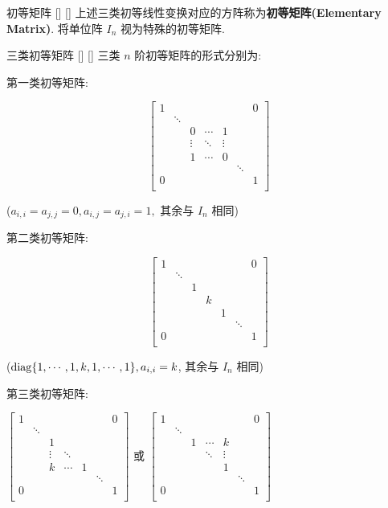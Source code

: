 \documentclass[UTF8]{ctexart}
\DeclareMathOperator{\0}{\mathbf{0}}
\DeclareMathOperator{\<}{\langle}
\renewcommand{\>}{\rangle}
\begin{document}
		\begin{dfn}
			[]
			{初等矩阵}
			[]
			[]
			上述三类初等线性变换对应的方阵称为\textbf{初等矩阵(Elementary Matrix)}. 将单位阵 \(I_n\) 视为特殊的初等矩阵. 
		\end{dfn}
		
		\begin{ppt}
			[]
			{三类初等矩阵}
			[]
			[]
			三类 \(n\) 阶初等矩阵的形式分别为: 
			
			第一类初等矩阵: 
			
			\[
			\begin{bmatrix}
				1 & & & & & & 0\\
				&\ddots & & & & & \\
				& & 0 & \cdots & 1 & & \\
				& &\vdots &\ddots &\vdots & & \\
				& & 1 & \cdots & 0 & & \\
				& & & & &\ddots & \\
				0 & & & & & & 1\\
			\end{bmatrix}
			\]
			
			(\(a_{i,i}=a_{j,j}=0,a_{i,j}=a_{j,i}=1,\)  其余与 \(I_n\) 相同)
			
			第二类初等矩阵: 
			
			\[
			\begin{bmatrix}
				1 & & & & & & 0\\
				&\ddots & & & & & \\
				& & 1 & & & & \\
				& & & k & & & \\
				& & & & 1 & & \\
				& & & & & \ddots & \\
				0 & & & & & & 1\\
			\end{bmatrix}
			\]
			
			(\({\rm diag}\{1,\cdots,1,k,1,\cdots,1\}, a_{i,i}=k\), 其余与 \(I_n\) 相同)
			
			第三类初等矩阵: 
			
			 \(\begin{bmatrix}
			1 & & & & & & 0\\
			 &\ddots & & & & & \\
			 & & 1 & & & & \\
			 & &\vdots &\ddots & & & \\
			 & & k & \cdots & 1 & & \\
			 & & & & &\ddots & \\
			0 & & & & & & 1\\
			\end{bmatrix}\) 
			或
			 \(\begin{bmatrix}
			1 & & & & & & 0\\
			 &\ddots & & & & & \\
			 & & 1 & \cdots & k & & \\
			 & & &\ddots & \vdots & & \\
			 & & & & 1 & & \\
			 & & & & &\ddots & \\
			0 & & & & & & 1\\
			\end{bmatrix}\) 
			

\end{ppt}
\end{document}
